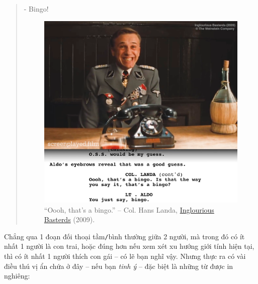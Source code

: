 \documentclass[12pt,oneside]{book}
\begin{document}
\begin{quotation}
	- Bingo!
	
	\begin{figure}[H]
		\centering
		\includegraphics[scale=0.3]{bingo}
		\caption{``Oooh, that's a bingo.'' -- Col. {\sf Hans Landa}, \href{https://www.imdb.com/title/tt0361748}{Inglourious Basterds} (2009).}
	\end{figure}
\end{quotation}
Chẳng qua 1 đoạn đối thoại tầm{\tt/}bình thường giữa 2 người, mà trong đó có ít nhất 1 người là con trai, hoặc đúng hơn nếu xem xét xu hướng giới tính hiện tại, thì có ít nhất 1 người thích con gái -- có lẽ bạn nghĩ vậy. Nhưng thực ra có vài điều thú vị ẩn chứa ở đây -- nếu bạn {\it tinh ý} -- đặc biệt là những từ được in nghiêng:
\end{document}
